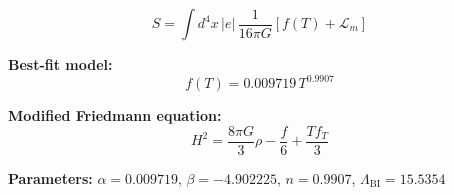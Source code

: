 
\begin{equation}
  S = \int d^4x \, |e| \, \frac{1}{16\pi G} \left[ f(T) + \mathcal{L}_m \right]
\end{equation}

\textbf{Best-fit model:}
\begin{equation}
  f(T) = 0.009719 \, T^{0.9907}
\end{equation}

\textbf{Modified Friedmann equation:}
\begin{equation}
  H^2 = \frac{8\pi G}{3} \rho - \frac{f}{6} + \frac{T f_T}{3}
\end{equation}

\textbf{Parameters:}
$\alpha = 0.009719$, \quad
$\beta = -4.902225$, \quad
$n = 0.9907$, \quad
$\Lambda_{\text{BI}} = 15.5354$